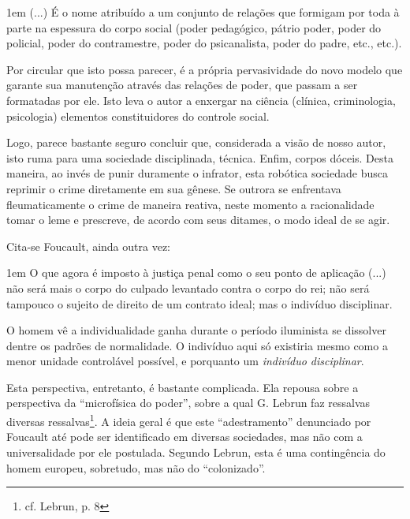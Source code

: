 \documentclass[12pt,a4paper]{article}
\newenvironment{citac}
{
	\begin{addmargin}
		[4cm]{1em} \footnotesize}{\normalfont 
	\end{addmargin}
}
\begin{document}
	\begin{citac}
		(...) É o nome atribuído a um conjunto de relações que 
		formigam por toda à parte na espessura do corpo social 
		(poder pedagógico, pátrio poder, poder do policial, poder 
		do contramestre, poder do psicanalista, poder do padre, 
		etc., etc.). %
	\end{citac}

	Por circular que isto possa parecer, é a própria pervasividade 
	do novo modelo que garante sua manutenção através das relações 
	de poder, que passam a ser formatadas por ele. Isto leva o 
	autor a enxergar na ciência (clínica, criminologia, psicologia) 
	elementos constituidores do controle social. 

	Logo, parece bastante seguro concluir que, considerada a visão de 
	nosso autor, isto ruma para uma sociedade disciplinada, técnica. 
	Enfim, corpos dóceis. Desta maneira, ao invés de punir duramente 
	o infrator, esta robótica sociedade busca reprimir o crime diretamente 
	em sua gênese. Se outrora se enfrentava fleumaticamente o crime 
	de maneira reativa, neste momento a racionalidade tomar o leme e 
	prescreve, de acordo com seus ditames, o modo ideal de se agir. 

	Cita-se Foucault, ainda outra vez: 

	\begin{citac}
		O que agora é imposto à justiça penal como o seu ponto de 
		aplicação (...) não será mais o corpo do culpado levantado 
		contra o corpo do rei; não será tampouco o sujeito de 
		direito de um contrato ideal; mas o indivíduo disciplinar. 
	\end{citac}

	O homem vê a individualidade ganha durante o período iluminista 
	se dissolver dentre os padrões de normalidade. O indivíduo aqui só 
	existiria mesmo como a menor unidade controlável possível, e porquanto 
	um \textit{indivíduo disciplinar}. 

	Esta perspectiva, entretanto, é bastante complicada. Ela repousa 
	sobre a perspectiva da ``microfísica do poder'', sobre a qual 
	G. Lebrun faz ressalvas diversas ressalvas\footnote{cf. Lebrun, p. 8}. 
	A ideia geral é que este ``adestramento'' denunciado por Foucault 
	até pode ser identificado em diversas sociedades, mas não com a 
	universalidade por ele postulada. Segundo Lebrun, esta é uma 
	contingência do homem europeu, sobretudo, mas não do ``colonizado''. 
\end{document}
